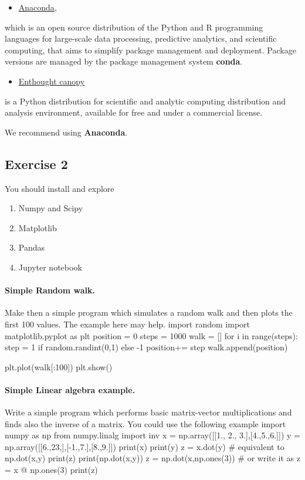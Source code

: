 \documentclass[%
oneside,                 %
final,                   %
10pt]{article}
\begin{document}
\begin{itemize}
\item \href{{https://docs.anaconda.com/}}{Anaconda}, 
\end{itemize}

\noindent
which is an open source
distribution of the Python and R programming languages for large-scale
data processing, predictive analytics, and scientific computing, that
aims to simplify package management and deployment. Package versions
are managed by the package management system \textbf{conda}. 

\begin{itemize}
\item \href{{https://www.enthought.com/product/canopy/}}{Enthought canopy} 
\end{itemize}

\noindent
is a Python
distribution for scientific and analytic computing distribution and
analysis environment, available for free and under a commercial
license.

We recommend using \textbf{Anaconda}.


\subsection{Exercise 2}

You should install and explore
\begin{enumerate}
\item Numpy and Scipy

\item Matplotlib

\item Pandas

\item Jupyter notebook
\end{enumerate}

\noindent
\paragraph{Simple Random walk.}
Make then a simple program which simulates a random walk and then plots the first 100 values. The example here may help.
\bpycod
import random
import matplotlib.pyplot as plt
position = 0  
steps = 1000
walk = []
for i in range(steps):     
    step = 1 if random.randint(0,1) else -1
    position+= step
    walk.append(position)

plt.plot(walk[:100])
plt.show()
\epycod

\paragraph{Simple Linear algebra example.}
Write a simple program which performs basic matrix-vector multiplications and finds also the inverse of a matrix. You could use the following example
\bpycod
import numpy as np
from numpy.linalg import inv
x = np.array([[1., 2., 3.],[4.,5.,6.]])
y = np.array([[6.,23,],[-1.,7.],[8.,9.]])
print(x)
print(y)
z = x.dot(y)
# equivalent to np.dot(x,y)
print(z)
print(np.dot(x,y))
z = np.dot(x,np.ones(3))
# or write it as 
z = x @ np.ones(3)
print(z)
\end{document}
